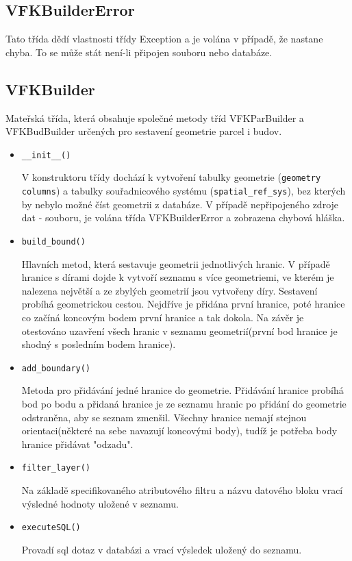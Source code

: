 \subsection{VFKBuilderError}
Tato třída dědí vlastnosti třídy Exception a je volána v případě, že nastane chyba. To se může stát není-li připojen  souboru nebo databáze.
\subsection{VFKBuilder}
\label{subsec:sestaveni_geometrie}
Mateřská třída, která obsahuje společné metody tříd VFKParBuilder a VFKBudBuilder určených pro sestavení geometrie parcel i budov.
\begin{itemize}[leftmargin=50pt]
\item \verb|__init__()|
		
V konstruktoru třídy dochází k vytvoření tabulky geometrie (\verb|geometry columns|) a tabulky souřadnicového systému (\verb|spatial_ref_sys|), bez kterých by nebylo možné číst geometrii z databáze. V případě nepřipojeného zdroje dat -  souboru, je volána třída VFKBuilderError a zobrazena chybová hláška.
\item \verb|build_bound()|

Hlavních metod, která sestavuje geometrii jednotlivých hranic. V případě hranice s dírami dojde k vytvoří seznamu s více geometriemi, ve kterém je nalezena největší a ze zbylých geometrií jsou vytvořeny díry. Sestavení probíhá geometrickou cestou. Nejdříve je přidána první hranice, poté hranice co začíná koncovým bodem první hranice a tak dokola. Na závěr je otestováno uzavření všech hranic v seznamu geometrií(první bod hranice je shodný s posledním bodem hranice).
\item \verb|add_boundary()|

Metoda pro přidávání jedné hranice do geometrie. Přidávání hranice probíhá bod po bodu a přidaná hranice je ze seznamu hranic po přidání do geometrie odstraněna, aby se seznam zmenšil. Všechny hranice nemají stejnou orientaci(některé na sebe navazují koncovými body), tudíž je potřeba body hranice přidávat "odzadu".
\item \verb|filter_layer()|

Na základě specifikovaného atributového filtru a názvu datového bloku vrací výsledné hodnoty uložené v seznamu.
\item \verb|executeSQL()|

Provadí sql dotaz v databázi a vrací výsledek uložený do seznamu.

\end{itemize}

